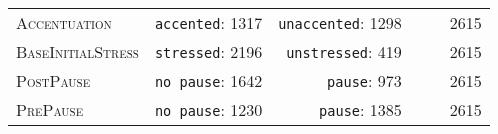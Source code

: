 \begin{table}[H]
\begin{center}
{\begin{tabular}{lrrrrr}
				\textsc{Accentuation}       &\texttt{accented}: 1317& \texttt{unaccented}: 1298& && 2615 \\ 
				\textsc{BaseInitialStress}       &\texttt{stressed}: 2196& \texttt{unstressed}: 419& & & 2615\\ 		
				\textsc{PostPause}       &\texttt{no pause}: 1642& \texttt{pause}: 973& && 2615 \\ 
				\textsc{PrePause}       &\texttt{no pause}: 1230 & \texttt{pause}: 1385& & & 2615\\ 
				\hline
			\end{tabular}
		}
	\end{center}

\end{table}




